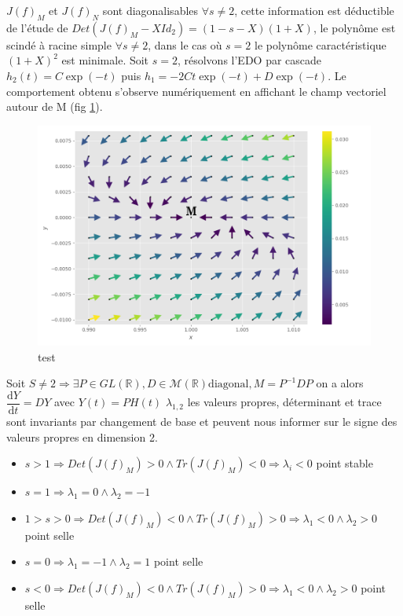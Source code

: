 \documentclass{wsdcr}
\begin{document}
$J(f)_{M}$ et $ J(f)_{N}$ sont diagonalisables $\forall s \neq 2$, cette information est déductible de l'étude de $Det(J(f)_{M}-XId_2)=(1-s-X)(1+X)$, le polynôme est scindé à racine simple $\forall s \neq 2$, dans le cas où $s=2$ le polynôme caractéristique $(1+X)^2$ est minimale. Soit $s=2$, résolvons l'EDO par cascade $h_2(t)=C\exp(-t)$ puis $h_1=-2Ct\exp(-t)+D\exp(-t)$. Le comportement obtenu s'observe numériquement en affichant le champ vectoriel autour de M (fig \ref{fig:JM}). \\
\begin{figure}
    \centering
    \includegraphics[width=\linewidth]{fig/lv2_vfM.png}
    \caption{test}
    \label{fig:JM}
\end{figure}
Soit $S\neq2 \Rightarrow \exists P \in GL(\mathbb{R}),D \in \mathcal{M}(\mathbb{R}) \text{diagonal}, M = P^{-1}DP$ on a alors ${\dfrac {\mathrm {d} Y}{\mathrm {d} t}}=DY$ avec $Y(t)=PH(t)$ $\lambda_{1,2}$ les valeurs propres, déterminant et trace sont invariants par changement de base et peuvent nous informer sur le signe des valeurs propres en dimension 2.
\begin{itemize}
	\item $s>1 \Rightarrow Det(J(f)_{M})>0 \land Tr(J(f)_{M})<0 \Rightarrow \lambda_i<0$ {\color{red}point stable}
	\item $s=1 \Rightarrow \lambda_1=0 \land \lambda_2=-1$ 
	\item $1>s>0 \Rightarrow Det(J(f)_{M})<0 \land Tr(J(f)_{M})>0 \Rightarrow \lambda_1<0 \land \lambda_2>0$ {\color{red}point selle}
	\item $s=0 \Rightarrow \lambda_1=-1 \land \lambda_2=1$ {\color{red}point selle}
	\item $s<0 \Rightarrow Det(J(f)_{M})<0 \land Tr(J(f)_{M})>0 \Rightarrow \lambda_1<0 \land \lambda_2>0$ {\color{red}point selle}
\end{itemize}
\end{document}
